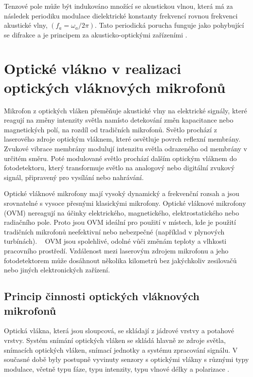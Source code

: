 Tenzové pole může být indukováno množící se akustickou vlnou, která má za následek periodiku modulace dielektrické konstanty frekvencí rovnou frekvenci akustické vlny, $(f_a = \omega_a/2\pi)$. Tato periodická porucha funguje jako pohybující se difrakce a je principem za akusticko-optickými zařízeními \cite{421}.

\section{Optické vlákno v realizaci optických vláknových mikrofonů}

Mikrofon z optických vláken přeměňuje akustické vlny na elektrické signály, které reagují na změny intenzity světla namísto detekování změn kapacitance nebo magnetických polí, na rozdíl od tradičních mikrofonů.
Světlo prochází z laserového zdroje optickým vláknem, které osvětluje povrch reflexní membrány. Zvukové vibrace membrány modulují intenzitu světla odrazeného od membrány v určitém směru. Poté modulované světlo prochází dalším optickým vláknem do fotodetektoru, který transformuje světlo na analogový nebo digitální zvukový signál, připravený pro vysílání nebo nahrávání\cite{5}.

Optické vláknové mikrofony mají vysoký dynamický a frekvenční rozsah a jsou srovnatelné s vysoce přesnými klasickými mikrofony. Optické vláknové mikrofony (OVM) nereagují na účinky elektrického, magnetického, elektrostatického nebo radiačního pole. Proto jsou OVM ideální pro použití v místech, kde je použití tradičních mikrofonů neefektivní nebo nebezpečné (například v plynových turbínách)\cite{5}.
 
OVM jsou spolehlivé, odolné vůči změnám teploty a vlhkosti pracovního prostředí. Vzdálenost mezi laserovým zdrojem mikrofonu a jeho fotodetektorem může dosáhnout několika kilometrů bez jakýchkoliv zesilovačů nebo jiných elektronických zařízení\cite{5}.

\subsection{Princip činnosti optických vláknových mikrofonů}

Optická vlákna, která jsou sloupcová, se skládají z jádrové vrstvy a potahové vrstvy. Systém snímání optických vláken se skládá hlavně ze zdroje světla, snímacích optických vláken, snímací jednotky a systému zpracování signálu. V současné době byly postupně vyvinuty senzory s optickými vlákny s různými typy modulace, včetně typu fáze, typu intenzity, typu vlnové délky a polarizace \cite{337}.

